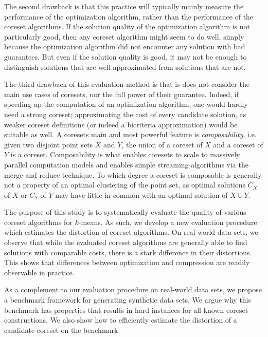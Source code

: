 The second drawback is that this practice will typically mainly measure the performance of the optimization algorithm, rather than the performance of the coreset algorithms. If the solution quality of the optimization algorithm is not particularly good, then any coreset algorithm might seem to do well, simply because the optimization algorithm did not encounter any solution with bad guarantees. But even if the solution quality is good, it may not be enough to distinguish solutions that are well approximated from solutions that are not.


The third drawback of this evaluation method is that is does not consider the main use cases of coresets, nor the full power of their guarantee. Indeed, if speeding up the computation of an optimization algorithm, one would hardly need a strong coreset; approximating the cost of every candidate solution, as weaker coreset definitions (or indeed a bicriteria approximation) would be suitable as well. A coresets main and most powerful feature is \emph{composability}, i.e. given two disjoint point sets $X$ and $Y$, the union of a coreset of $X$ and a coreset of $Y$ is a coreset. Composability is what enables coresets to scale to massively parallel computation models and enables simple streaming algorithms via the merge and reduce technique. To which degree a coreset is composable is generally not a property of an optimal clustering of the point set, as optimal solutions $C_X$ of $X$ or $C_Y$ of $Y$ may have little in common with an optimal solution of $X\cup Y$. 


The purpose of this study is to systematically evaluate the quality of various coreset algorithms for $k$-means. As such, we develop a new evaluation procedure which estimates the distortion of coreset algorithms. On real-world data sets, we observe that while the evaluated coreset algorithms are generally able to find solutions with comparable costs, there is a stark difference in their distortions. This shows that differences between optimization and compression are readily observable in practice.

As a complement to our evaluation procedure on real-world data sets, we propose a benchmark framework for generating synthetic data sets. We argue why this benchmark has properties that results in hard instances for all known coreset constructions. We also show how to efficiently estimate the distortion of a candidate coreset on the benchmark.


